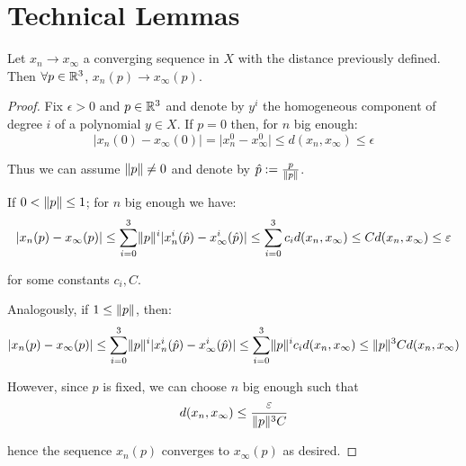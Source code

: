 \documentclass[9pt]{article}
\begin{document}
\section{Technical Lemmas}
\label{sec:lemmas}

\begin{lemma}\label{convergence}
 Let $x_n \rightarrow x_\infty$ a converging sequence in $X$ with the distance previously defined. Then $\forall p\in \mathbb{R}^3$, $x_n(p) \rightarrow x_\infty(p)$.
\end{lemma}
\begin{proof}
  Fix $\epsilon > 0$ and $p\in \mathbb{R}^3$ and denote by $y^i$ the homogeneous component of degree $i$ of a polynomial $y\in X$. If $p=0$ then, for $n$ big enough:
  \[
    \vert x_n(0) - x_\infty(0) \vert = \vert x_n^0 - x_\infty^0 \vert \leq d(x_n, x_\infty) \leq \epsilon
\]

Thus we can assume $\lVert p \rVert \neq 0$ and denote by $\hat{p}:=\frac{p}{\lVert p \rVert}$.

  If $0<\lVert p \rVert \leq 1$; for $n$ big enough we have:
  \[
    \vert x_n(p) - x_\infty(p) \vert \leq \sum_{i=0}^3 \lVert p \rVert^i\vert x_n^i(\hat{p})-x_\infty^i(\hat{p})\vert \leq \sum_{i=0}^3c_id(x_n, x_\infty)\leq C d(x_n, x_\infty)\leq \varepsilon
  \]

  for some constants $c_i, C$.

  Analogously, if $1\leq \lVert p \rVert$, then:
  \[
    \vert x_n(p) - x_\infty(p) \vert \leq \sum_{i=0}^3 \lVert p \rVert^i\vert x_n^i(\hat{p})-x_\infty^i(\hat{p})\vert \leq \sum_{i=0}^3\lVert p \rVert^ic_id(x_n, x_\infty)\leq \lVert p \rVert^3 C d(x_n, x_\infty)
  \]

  However, since $p$ is fixed, we can choose $n$ big enough such that
  \[
    d(x_n, x_\infty)\leq \frac{\varepsilon}{\lVert p \rVert^3C}
\]

hence the sequence $x_n(p)$ converges to $x_\infty(p)$ as desired.
\end{proof}
\end{document}
